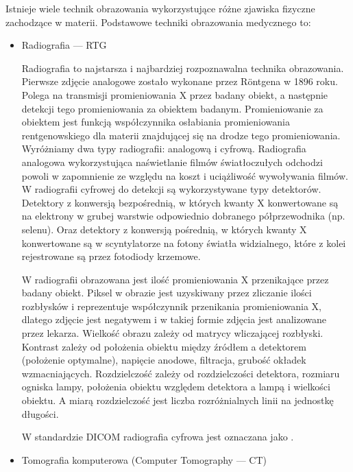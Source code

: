 Istnieje wiele technik obrazowania wykorzystujące różne zjawiska fizyczne zachodzące w materii.
Podstawowe techniki obrazowania medycznego to:
\label{sec:basic-imaging-technics}
\begin{itemize}
    \item Radiografia --- RTG

          Radiografia to najstarsza i najbardziej rozpoznawalna technika obrazowania.
          Pierwsze zdjęcie analogowe zostało wykonane przez Röntgena w 1896 roku.
          Polega na transmisji promieniowania X przez badany obiekt, a następnie detekcji tego promieniowania za obiektem badanym.
          Promieniowanie za obiektem jest funkcją współczynnika osłabiania promieniowania rentgenowskiego dla materii znajdującej się na drodze tego promieniowania.
          Wyróżniamy dwa typy radiografii: analogową i cyfrową.
          Radiografia analogowa wykorzystująca naświetlanie filmów światłoczułych odchodzi powoli w zapomnienie ze względu na koszt i uciążliwość wywoływania filmów.
          W radiografii cyfrowej do detekcji są wykorzystywane typy detektorów.
          Detektory z konwersją bezpośrednią, w których kwanty X konwertowane są na elektrony w grubej warstwie odpowiednio dobranego półprzewodnika (np. selenu).
          Oraz detektory z konwersją pośrednią, w których kwanty X konwertowane są w scyntylatorze na fotony światła widzialnego, które z kolei rejestrowane są przez fotodiody krzemowe.

          W radiografii obrazowana jest ilość promieniowania X przenikające przez badany obiekt.
          Piksel w obrazie jest uzyskiwany przez zliczanie ilości rozbłysków i reprezentuje współczynnik przenikania promieniowania X, dlatego zdjęcie jest negatywem i w takiej formie zdjęcia jest analizowane przez lekarza.
          Wielkość obrazu zależy od matrycy wliczającej rozbłyski.
          Kontrast zależy od położenia obiektu między źródłem a detektorem (położenie optymalne), napięcie anodowe, filtracja, grubość okładek wzmacniających.
          Rozdzielczość zależy od rozdzielczości detektora, rozmiaru ogniska lampy, położenia obiektu względem detektora a lampą i wielkości obiektu.
          A miarą rozdzielczość jest liczba rozróżnialnych linii na jednostkę długości.

          W standardzie DICOM radiografia cyfrowa jest oznaczana jako .

    \item Tomografia komputerowa (Computer Tomography --- CT)


\end{itemize}
